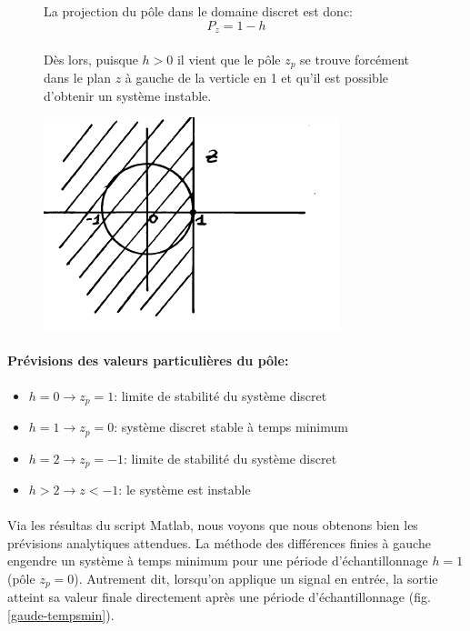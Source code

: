 \begin{figure}[!ht] 
  \begin{minipage}[b]{0.7\linewidth}
  La projection du pôle dans le domaine discret est donc:
	\begin{equation*}
	P_{z} = 1 - h
	\end{equation*}
	\paragraph{}
  Dès lors, puisque $h>0$ il vient que le pôle $z_{p}$ se trouve forcément dans le plan $z$ à gauche de la verticle en 1 et qu'il est possible d'obtenir un système instable.
  \end{minipage}%
  \begin{minipage}[b]{0.3\linewidth}
    \centering
    \includegraphics[scale=.6]{images/labo1-dom-gauche} 
   \end{minipage} 
\end{figure}

\newpage
\paragraph{Prévisions des valeurs particulières du pôle:}
\begin{itemize}[label=$\cdot$]
\item $h=0 \rightarrow z_{p}=1$: limite de stabilité du système discret
\item $h=1 \rightarrow z_{p}=0$: système discret stable à temps minimum
\item $h=2 \rightarrow z_{p}=-1$: limite de stabilité du système discret
\item $h>2 \rightarrow z<-1$: le système est instable
\end{itemize}
\paragraph{}
Via les résultas du script Matlab, nous voyons que nous obtenons bien les prévisions analytiques attendues. La méthode des différences finies à gauche engendre un système à temps minimum pour une période d'échantillonnage $h=1$ (pôle $z_{p} = 0$). Autrement dit, lorsqu'on applique un signal en entrée, la sortie atteint sa valeur finale directement après une période d'échantillonnage (fig. \ref{gaude-tempsmin}).

